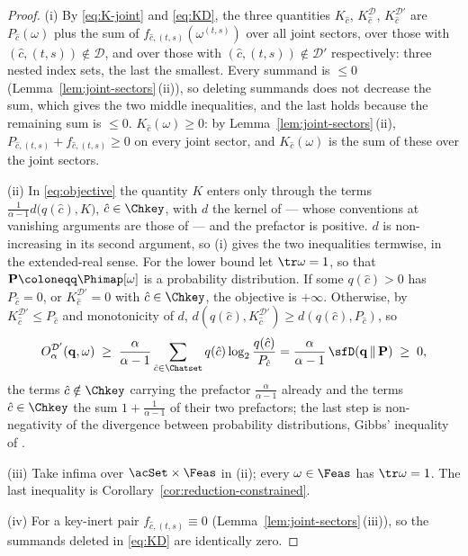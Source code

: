\begin{proof}
(i) By \eqref{eq:K-joint} and \eqref{eq:KD}, the three quantities
$K_{\hat c}$, $K^{\mathcal{D}}_{\hat c}$, $K^{\mathcal{D}'}_{\hat c}$ are
$P_{\hat c}(\omega)$ plus the sum of $f_{\hat c,(t,s)}(\omega^{(t,s)})$ over
all joint sectors, over those with $(\hat c,(t,s))\notin\mathcal{D}$, and
over those with $(\hat c,(t,s))\notin\mathcal{D}'$ respectively: three
nested index sets, the last the smallest. Every summand is $\le0$
(Lemma~\ref{lem:joint-sectors}\,(ii)), so deleting summands does not
decrease the sum, which gives the two middle inequalities, and the last
holds because the remaining sum is $\le0$. $K_{\hat c}(\omega)\ge0$: by
Lemma~\ref{lem:joint-sectors}\,(ii),
$P_{\hat c,(t,s)}+f_{\hat c,(t,s)}\ge0$ on every joint sector, and
$K_{\hat c}(\omega)$ is the sum of these over the joint sectors.

(ii) In \eqref{eq:objective} the quantity $K$ enters only through the terms
$\frac{1}{\alpha-1}d\big(q(\hat c),K\big)$, $\hat c\in\Chkey$, with $d$ the
kernel of  --- whose conventions at vanishing arguments
are those of  --- and the prefactor is positive. $d$
is non-increasing in its second argument, so (i) gives the two inequalities
termwise, in the extended-real sense. For the lower bound let $\tr\omega=1$,
so that $\mathbf P\coloneqq\Phimap[\omega]$ is a probability distribution. If
some $q(\hat c)>0$ has $P_{\hat c}=0$, or
$K^{\mathcal{D}'}_{\hat c}=0$ with $\hat c\in\Chkey$, the objective is
$+\infty$. Otherwise, by $K^{\mathcal{D}'}_{\hat c}\le P_{\hat c}$ and
monotonicity of $d$,
$d(q(\hat c),K^{\mathcal{D}'}_{\hat c})\ge d(q(\hat c),P_{\hat c})$, so
\begin{equation*}
  O^{\mathcal{D}'}_{\alpha}(\mathbf q,\omega)\;\ge\;
  \frac{\alpha}{\alpha-1}\sum_{\hat c\in\Chatset}
  q(\hat c)\log_2\frac{q(\hat c)}{P_{\hat c}}
  =\frac{\alpha}{\alpha-1}\,\sfD(\mathbf q\,\|\,\mathbf P)\;\ge\;0 ,
\end{equation*}
the terms $\hat c\notin\Chkey$ carrying the prefactor
$\frac{\alpha}{\alpha-1}$ already and the terms $\hat c\in\Chkey$ the sum
$1+\frac{1}{\alpha-1}$ of their two prefactors; the last step is
non-negativity of the divergence between probability distributions,
Gibbs' inequality of .

(iii) Take infima over $\acSet\times\Feas$ in (ii); every $\omega\in\Feas$
has $\tr\omega=1$. The last inequality is
Corollary~\ref{cor:reduction-constrained}.

(iv) For a key-inert pair $f_{\hat c,(t,s)}\equiv0$
(Lemma~\ref{lem:joint-sectors}\,(iii)), so the summands deleted in
\eqref{eq:KD} are identically zero.
\end{proof}
